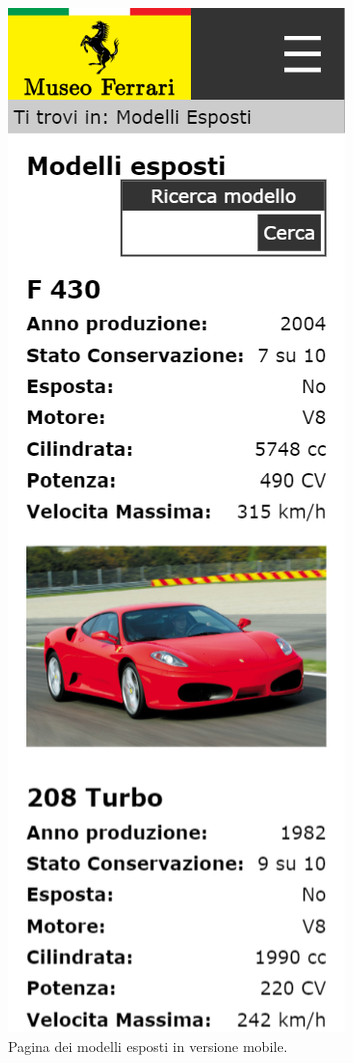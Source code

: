\begin{figure}[H]
	\begin{center}
		\includegraphics[scale=.3]{Images/modelliEsposti_mobile.png}
		\caption{Pagina dei modelli esposti in versione mobile.}
	\end{center}
\end{figure}
